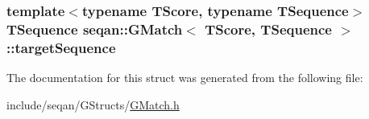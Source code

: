 \hypertarget{structseqan_1_1_g_match_a13f2c3906e402472217935df02c0c134}{
\subsubsection[{target\-Sequence}]{\setlength{\rightskip}{0pt plus 5cm}template$<$typename T\-Score, typename T\-Sequence$>$ T\-Sequence {\bf seqan\-::\-G\-Match}$<$ T\-Score, T\-Sequence $>$\-::target\-Sequence}}\label{structseqan_1_1_g_match_a13f2c3906e402472217935df02c0c134}


The documentation for this struct was generated from the following file\-:\begin{DoxyCompactItemize}
\item 
include/seqan/\-G\-Structs/\hyperlink{_g_match_8h}{G\-Match.\-h}\end{DoxyCompactItemize}
